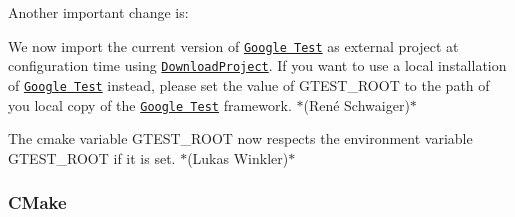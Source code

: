 Another important change is\+:


\begin{DoxyItemize}
\item We now import the current version of \href{https://github.com/google/googletest}{\tt Google Test} as external project at configuration time using \href{https://github.com/Crascit/DownloadProject}{\tt Download\+Project}. If you want to use a local installation of \href{https://github.com/google/googletest}{\tt Google Test} instead, please set the value of {\ttfamily G\+T\+E\+S\+T\+\_\+\+R\+O\+OT} to the path of you local copy of the \href{https://github.com/google/googletest}{\tt Google Test} framework. $\ast$(René Schwaiger)$\ast$
\item The cmake variable {\ttfamily G\+T\+E\+S\+T\+\_\+\+R\+O\+OT} now respects the environment variable {\ttfamily G\+T\+E\+S\+T\+\_\+\+R\+O\+OT} if it is set. $\ast$(Lukas Winkler)$\ast$
\end{DoxyItemize}

\subsubsection*{C\+Make}


